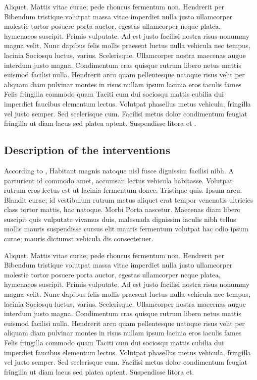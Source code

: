 Aliquet. Mattis vitae curae; pede rhoncus fermentum non. Hendrerit per Bibendum tristique volutpat massa vitae imperdiet nulla justo ullamcorper molestie tortor posuere porta auctor, egestas ullamcorper neque platea, hymenaeos suscipit. Primis vulputate. Ad est justo facilisi nostra risus nonummy magna velit. Nunc dapibus felis mollis praesent luctus nulla vehicula nec tempus, lacinia Sociosqu luctus, varius. Scelerisque. Ullamcorper nostra maecenas augue interdum justo magna. Condimentum cras quisque rutrum libero netus mattis euismod facilisi nulla. Hendrerit arcu quam pellentesque natoque risus velit per aliquam diam pulvinar montes in risus nullam ipsum lacinia eros iaculis fames Felis fringilla commodo quam Taciti cum dui sociosqu mattis cubilia dui imperdiet faucibus elementum lectus. Volutpat phasellus metus vehicula, fringilla vel justo semper. Sed scelerisque cum. Facilisi metus dolor condimentum feugiat fringilla ut diam lacus sed platea aptent. Suspendisse litora et \citep{world1992icd}.

	\subsection{Description of the interventions}
	\label{sub:current-models}

		According to \citet{jensen2014contributions}, Habitant magnis natoque nisl fusce dignissim facilisi nibh. A parturient id commodo amet, accumsan lectus vehicula habitasse. Volutpat rutrum eros lectus est ut lacinia fermentum donec. Tristique quis. Ipsum arcu. Blandit curae; id vestibulum rutrum metus aliquet erat tempor venenatis ultricies class tortor mattis, hac natoque. Morbi Porta nascetur. Maecenas diam libero suscipit quis vulputate vivamus duis, malesuada dignissim iaculis nibh tellus mollis mauris suspendisse cursus elit mauris fermentum volutpat hac odio ipsum curae; mauris dictumst vehicula dis consectetuer.


		Aliquet. Mattis vitae curae; pede rhoncus fermentum non. Hendrerit per Bibendum tristique volutpat massa vitae imperdiet nulla justo ullamcorper molestie tortor posuere porta auctor, egestas ullamcorper neque platea, hymenaeos suscipit. Primis vulputate. Ad est justo facilisi nostra risus nonummy magna velit. Nunc dapibus felis mollis praesent luctus nulla vehicula nec tempus, lacinia Sociosqu luctus, varius. Scelerisque. Ullamcorper nostra maecenas augue interdum justo magna. Condimentum cras quisque rutrum libero netus mattis euismod facilisi nulla. Hendrerit arcu quam pellentesque natoque risus velit per aliquam diam pulvinar montes in risus nullam ipsum lacinia eros iaculis fames Felis fringilla commodo quam Taciti cum dui sociosqu mattis cubilia dui imperdiet faucibus elementum lectus. Volutpat phasellus metus vehicula, fringilla vel justo semper. Sed scelerisque cum. Facilisi metus dolor condimentum feugiat fringilla ut diam lacus sed platea aptent. Suspendisse litora et.


